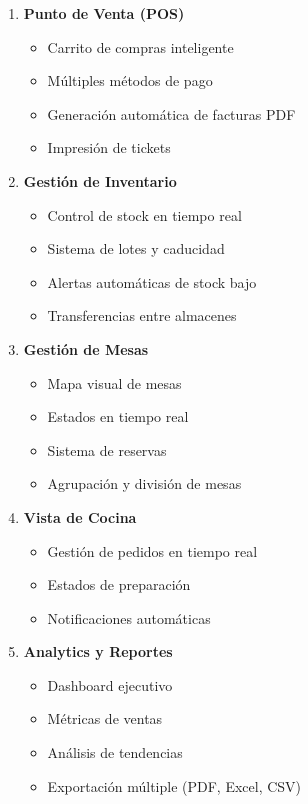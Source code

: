 \documentclass[12pt,a4paper]{article}
\begin{document}
\begin{enumerate}
    \item \textbf{Punto de Venta (POS)}
    \begin{itemize}
        \item Carrito de compras inteligente
        \item Múltiples métodos de pago
        \item Generación automática de facturas PDF
        \item Impresión de tickets
    \end{itemize}
    
    \item \textbf{Gestión de Inventario}
    \begin{itemize}
        \item Control de stock en tiempo real
        \item Sistema de lotes y caducidad
        \item Alertas automáticas de stock bajo
        \item Transferencias entre almacenes
    \end{itemize}
    
    \item \textbf{Gestión de Mesas}
    \begin{itemize}
        \item Mapa visual de mesas
        \item Estados en tiempo real
        \item Sistema de reservas
        \item Agrupación y división de mesas
    \end{itemize}
    
    \item \textbf{Vista de Cocina}
    \begin{itemize}
        \item Gestión de pedidos en tiempo real
        \item Estados de preparación
        \item Notificaciones automáticas
    \end{itemize}
    
    \item \textbf{Analytics y Reportes}
    \begin{itemize}
        \item Dashboard ejecutivo
        \item Métricas de ventas
        \item Análisis de tendencias
        \item Exportación múltiple (PDF, Excel, CSV)
    \end{itemize}
\end{enumerate}
\end{document}
